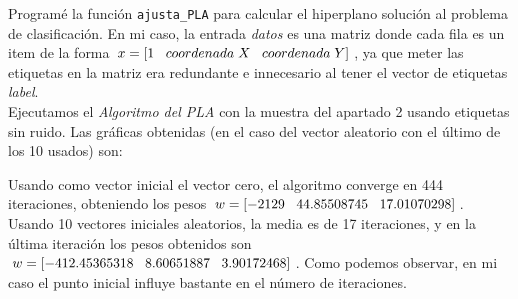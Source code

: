 \documentclass{article}
\begin{document}
Programé la función \texttt{ajusta\_PLA} para calcular el hiperplano solución al problema de clasificación. En mi caso, la entrada \textit{datos} es una matriz donde cada fila es un item de la forma $x = [1 \hspace{3mm} coordenada\hspace{1mm}X \hspace{3mm} coordenada\hspace{1mm}Y]$, ya que meter las etiquetas en la matriz era redundante e innecesario al tener el vector de etiquetas \textit{label}.\\

Ejecutamos el \textit{Algoritmo del PLA} con la muestra del apartado  2 usando etiquetas sin ruido. Las gráficas obtenidas (en el caso del vector aleatorio con el último de los 10 usados) son:

\begin{figure}[H]
  \centering
\end{figure}

Usando como vector inicial el vector cero, el algoritmo converge en 444 iteraciones, obteniendo los pesos $w = [ -2129 \hspace{3mm} 44.85508745 \hspace{3mm} 17.01070298 ]$. Usando 10 vectores iniciales aleatorios, la media es de 17 iteraciones, y en la última iteración los pesos obtenidos son $w = [ -412.45365318 \hspace{3mm} 8.60651887 \hspace{3mm} 3.90172468]$. Como podemos observar, en mi caso el punto inicial influye bastante en el número de iteraciones.\\
\end{document}
